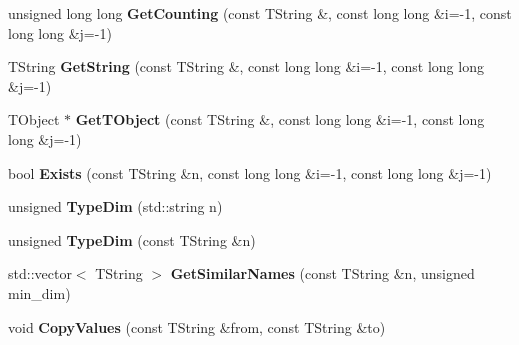\begin{DoxyCompactItemize}
\item 
\hypertarget{class_h_a_l_1_1_analysis_data_af7d47f613b3745eae74b59e82d718b5b}{unsigned long long {\bfseries Get\-Counting} (const T\-String \&, const long long \&i=-\/1, const long long \&j=-\/1)}\label{class_h_a_l_1_1_analysis_data_af7d47f613b3745eae74b59e82d718b5b}

\item 
\hypertarget{class_h_a_l_1_1_analysis_data_a983d806a18f7d81bf7b0405375442e9d}{T\-String {\bfseries Get\-String} (const T\-String \&, const long long \&i=-\/1, const long long \&j=-\/1)}\label{class_h_a_l_1_1_analysis_data_a983d806a18f7d81bf7b0405375442e9d}

\item 
\hypertarget{class_h_a_l_1_1_analysis_data_af1d5b191d8ccec6fb120a7debee1a474}{T\-Object $\ast$ {\bfseries Get\-T\-Object} (const T\-String \&, const long long \&i=-\/1, const long long \&j=-\/1)}\label{class_h_a_l_1_1_analysis_data_af1d5b191d8ccec6fb120a7debee1a474}

\item 
\hypertarget{class_h_a_l_1_1_analysis_data_a88485900b08fc820b2021234699d72d9}{bool {\bfseries Exists} (const T\-String \&n, const long long \&i=-\/1, const long long \&j=-\/1)}\label{class_h_a_l_1_1_analysis_data_a88485900b08fc820b2021234699d72d9}

\item 
\hypertarget{class_h_a_l_1_1_analysis_data_a493762f931219f8a720d06a263a4ad23}{unsigned {\bfseries Type\-Dim} (std\-::string n)}\label{class_h_a_l_1_1_analysis_data_a493762f931219f8a720d06a263a4ad23}

\item 
\hypertarget{class_h_a_l_1_1_analysis_data_ab0c4af2c4db8ebe38fd883ed0a2c2a72}{unsigned {\bfseries Type\-Dim} (const T\-String \&n)}\label{class_h_a_l_1_1_analysis_data_ab0c4af2c4db8ebe38fd883ed0a2c2a72}

\item 
\hypertarget{class_h_a_l_1_1_analysis_data_ae12492f13299eabe287205392489a4c4}{std\-::vector$<$ T\-String $>$ {\bfseries Get\-Similar\-Names} (const T\-String \&n, unsigned min\-\_\-dim)}\label{class_h_a_l_1_1_analysis_data_ae12492f13299eabe287205392489a4c4}

\item 
\hypertarget{class_h_a_l_1_1_analysis_data_a02f185a0bb593efe8f1e1605a8db7212}{void {\bfseries Copy\-Values} (const T\-String \&from, const T\-String \&to)}\label{class_h_a_l_1_1_analysis_data_a02f185a0bb593efe8f1e1605a8db7212}


\end{DoxyCompactItemize}
